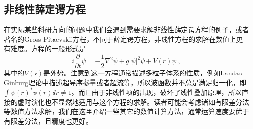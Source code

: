

\subsection{非线性薛定谔方程}
在实际某些科研方向的问题中我们会遇到需要求解非线性薛定谔方程的例子，或者著名的Gross-Pitaevskii方程，不同于薛定谔方程，非线性方程的求解在数值上更有难度。方程的一般形式是
\begin{equation}
i \frac{\partial}{\partial t} \psi = -\frac{1}{2}\nabla^2 \psi + g |\psi|^2 \psi + V(r)\psi~,
\end{equation}
其中的$V(r)$是外势。注意到这一方程通常描述多粒子体系的性质，例如Landau-Ginburg理论中描述超导序参量或者超流等，所以波函数并不总是满足归一化，即$\int \psi(r)^*\psi(r) dr \neq 1$。而且由于非线性项的出现，破坏了线性叠加原理，所以直接的虚时演化也不显然地适用与这个方程的求解。读者可能会考虑诸如有限差分法等数值方法求解，我们在这里介绍一些其它的数值计算方法，通常运算速度要优于有限差分法，且精度也更好。
